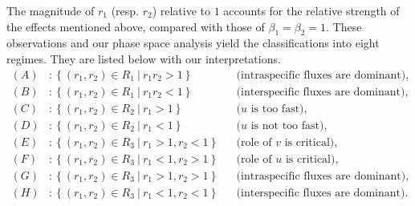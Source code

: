 \documentclass{amsart}
\theoremstyle{definition}
\numberwithin{equation}{section}
\begin{document}
The magnitude of $r_1$ (resp. $r_2$) relative to $1$ accounts for the relative strength of the effects mentioned above, compared with those of $\beta_1=\beta_2=1$.
These observations and our phase space analysis yield the classifications into eight regimes. They are listed below with our interpretations.
\begin{equation} \label{class2}
\begin{aligned}
 (A)&:\left\{(r_1, r_2) \in R_1 ~|~ r_1r_2> 1\right\} && \text{(intraspecific fluxes are dominant)},\\%
 (B)&:\left\{(r_1, r_2) \in R_1 ~|~ r_1r_2 < 1\right\} &&\text{(interspecific fluxes are dominant)},\\%
 (C)&:\left\{(r_1, r_2) \in R_2 ~|~ r_1> 1\right\} && \text{($u$ is too fast)}, \\%
 (D)&:\left\{(r_1, r_2) \in R_2 ~|~ r_1< 1\right\} && \text{($u$ is not too fast)},\\ %
 (E)&:\left\{(r_1, r_2) \in R_3 ~|~ r_1>1, r_2 < 1\right\}&& \text{(role of $v$ is critical)},\\
 (F)&:\left\{(r_1, r_2) \in R_3 ~|~ r_1<1, r_2 > 1\right\}&& \text{(role of $u$ is critical)},\\
 (G)&:\left\{(r_1, r_2) \in R_3 ~|~ r_1> 1, r_2 > 1\right\}&& \text{(intraspecific fluxes are dominant)},\\%
 (H)&:\left\{(r_1, r_2) \in R_3 ~|~ r_1<1, r_2 < 1\right\}&& \text{(interspecific fluxes are dominant)}.\\%
\end{aligned}
\end{equation}
\end{document}
